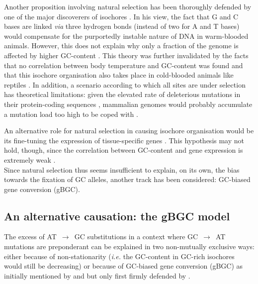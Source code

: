 Another proposition involving natural selection has been thoroughly defended by one of the major discoverers of isochores \citep{bernardi2000isochores,bernardi2007neoselectionist,bernardi2012genome}. 
In his view, the fact that G and C bases are linked \textit{via} three hydrogen bonds (instead of two for A and T bases) would compensate for the purportedly instable nature of DNA in warm-blooded animals.
However, this does not explain why only a fraction of the genome is affected by higher GC-content \citep{duret2009biased}.
This theory was further invalidated by the facts that no correlation between body temperature and GC-content was found \citep{belle2002analysis,ream2003base} and that this isochore organisation also takes place in cold-blooded animals like reptiles \citep{hughes1999warmblooded,hamada2003presence,costantini2016anolis}.
In addition, a scenario according to which all sites are under selection has theoretical limitations: given the elevated rate of deleterious mutations in their protein-coding sequences \citep{eyre-walker1999high,keightley2000deleterious}, mammalian genomes would probably accumulate a mutation load too high to be coped with \citep{eyre-walker2001evolution}.

An alternative role for natural selection in causing isochore organisation would be its fine-tuning the expression of tissue-specific genes \citep{vinogradov2003isochores,vinogradov2005noncoding}.
This hypothesis may not hold, though, since the correlation between GC-content and gene expression is extremely weak \citep[reviewed in \citealp{duret2009biased}]{semon2005relationship,semon2006no}.\\


Since natural selection thus seems insufficient to explain, on its own, the bias towards the fixation of GC alleles, another track has been considered: GC-biased gene conversion (gBGC).





\subsection{An alternative causation: the gBGC model}

The excess of AT~$\rightarrow$~GC substitutions in a context where GC~$\rightarrow$~AT mutations are preponderant can be explained in two non-mutually exclusive ways: either because of non-stationarity (\textit{i.e.} the GC-content in GC-rich isochores would still be decreasing) or because of GC-biased gene conversion (gBGC) as initially mentioned by \citet{holmquist1992chromosome} and \citet{eyre-walker1993recombination,eyre-walker1999evidence} but only first firmly defended by \citet{galtier2001gccontent}.

